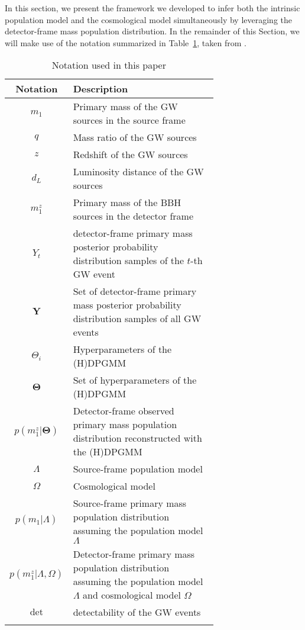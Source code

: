 \documentclass[sn-aps, pdflatex, iicol]{sn-jnl}
\begin{document}
In this section, we present the framework we developed to infer both the intrinsic population model and the cosmological model simultaneously by leveraging the detector-frame mass population distribution.
In the remainder of this Section, we will make use of the notation summarized in Table~\ref{tab:notation}, taken from \cite{Rinaldi:2021bhm, Rinaldi:2022kyg}.

\begin{table}[htbp]
    \caption{Notation used in this paper}
    \begin{tabular}{cp{0.7\linewidth}}
        \toprule
        Notation & Description \\
        \midrule
        $m_1$ & Primary mass of the \ac{GW} sources in the source frame \\
        $q$ & Mass ratio of the \ac{GW} sources \\
        $z$ & Redshift of the \ac{GW} sources \\
        $d_L$ & Luminosity distance of the \ac{GW} sources \\
        $m^z_1$ & Primary mass of the \ac{BBH} sources in the detector frame \\
        $Y_t$ & detector-frame primary mass posterior probability distribution samples of the $t$-th \ac{GW} event \\
        $\mathbf{Y}$ & Set of detector-frame primary mass posterior probability distribution samples of all \ac{GW} events \\
        $\Theta_i$ & Hyperparameters of the \ac{(H)DPGMM} \\
        $\mathbf{\Theta}$ & Set of hyperparameters of the \ac{(H)DPGMM} \\
        $p(m^z_1|\mathbf{\Theta})$ & Detector-frame observed primary mass population distribution reconstructed with the \ac{(H)DPGMM} \\
        $\Lambda$ & Source-frame population model \\
        $\Omega$ & Cosmological model \\
        $p(m_1|\Lambda)$ & Source-frame primary mass population distribution assuming the population model $\Lambda$ \\
        $p(m^z_1|\Lambda, \Omega)$ & Detector-frame primary mass population distribution assuming the population model $\Lambda$ and cosmological model $\Omega$ \\
        $\mathrm{det}$ & detectability of the \ac{GW} events \\
        \botrule
    \end{tabular}
    \label{tab:notation}
\end{table}
\end{document}
